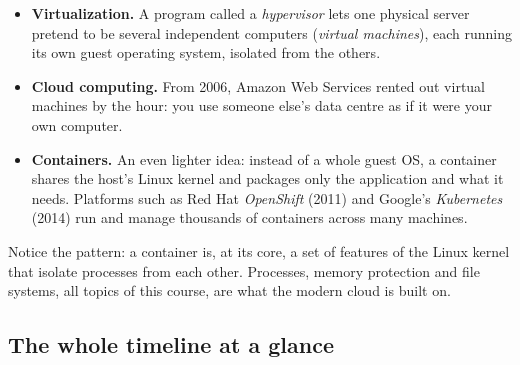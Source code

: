 \documentclass[11pt,a4paper]{article}
\newcommand{\term}[1]{\textbf{\color{mintdeep}#1}}
\begin{document}
\begin{itemize}
  \item \term{Virtualization.} A program called a \emph{hypervisor} lets one physical server pretend to be several independent computers (\emph{virtual machines}), each running its own guest operating system, isolated from the others.
  \item \term{Cloud computing.} From 2006, Amazon Web Services rented out virtual machines by the hour: you use someone else's data centre as if it were your own computer.
  \item \term{Containers.} An even lighter idea: instead of a whole guest OS, a container shares the host's Linux kernel and packages only the application and what it needs. Platforms such as Red Hat \emph{OpenShift} (2011) and Google's \emph{Kubernetes} (2014) run and manage thousands of containers across many machines.
\end{itemize}

Notice the pattern: a container is, at its core, a set of features of the Linux kernel that isolate processes from each other. Processes, memory protection and file systems, all topics of this course, are what the modern cloud is built on.

\subsection{The whole timeline at a glance}
\end{document}

